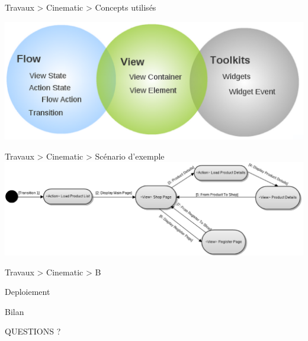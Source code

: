 \documentclass[HeilHazel,pdf,final,colorBG,slideColor]{prosper}
\begin{document}
\begin{slide}{Travaux > Cinematic > Concepts utilisés}

  \bc{} 
    \includegraphics[scale=.3]{img/cinematic_concepts.eps} 
  \ec{}

\end{slide}

\begin{slide}{Travaux > Cinematic > Scénario d'exemple}
  \bc{} 
    \includegraphics[scale=.25]{img/cinematic_act.eps} 
  \ec{}
\end{slide}

\begin{slide}{Travaux > Cinematic > B}

\end{slide}

\begin{slide}{Deploiement}
\end{slide}


\begin{slide}{Bilan}
\end{slide}


\begin{slide}{QUESTIONS ?}

\end{slide}
\end{document}
